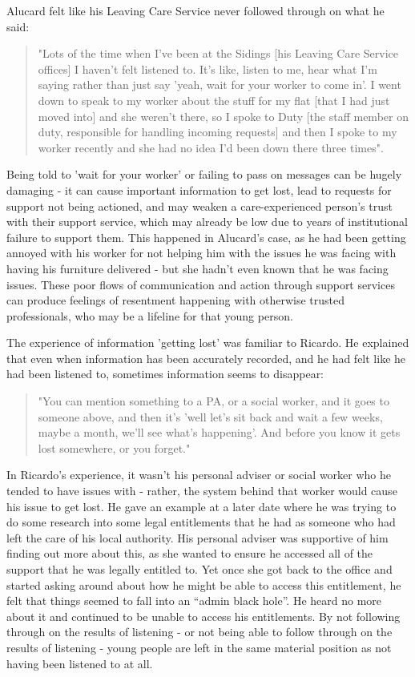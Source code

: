 Alucard felt like his Leaving Care Service never followed through on what he said:
\begin{quote}
"Lots of the time when I've been at the Sidings [his Leaving Care Service offices] I haven't felt listened to. It's like, listen to me, hear what I'm saying rather than just say 'yeah, wait for your worker to come in'. I went down to speak to my worker about the stuff for my flat [that I had just moved into] and she weren't there, so I spoke to Duty [the staff member on duty, responsible for handling incoming requests] and then I spoke to my worker recently and she had no idea I'd been down there three times".
\end{quote}
Being told to 'wait for your worker' or failing to pass on messages can be hugely damaging - it can cause important information to get lost, lead to requests for support not being actioned, and may weaken a care-experienced person’s trust with their support service, which may already be low due to years of institutional failure to support them.  This happened in Alucard’s case, as he had been getting annoyed with his worker for not helping him with the issues he was facing with having his furniture delivered - but she hadn’t even known that he was facing issues. These poor flows of communication and action through support services can produce feelings of resentment happening with otherwise trusted professionals, who may be a lifeline for that young person. 

The experience of information 'getting lost' was familiar to Ricardo. He explained that even when information has been accurately recorded, and he had felt like he had been listened to, sometimes information seems to disappear:
\begin{quote}
"You can mention something to a PA, or a social worker, and it goes to someone above, and then it's 'well let's sit back and wait a few weeks, maybe a month, we'll see what's happening'. And before you know it gets lost somewhere, or you forget."
\end{quote}
In Ricardo's experience, it wasn’t his personal adviser or social worker who he tended to have issues with - rather, the system behind that worker would cause his issue to get lost. He gave an example at a later date where he was trying to do some research into some legal entitlements that he had as someone who had left the care of his local authority. His personal adviser was supportive of him finding out more about this, as she wanted to ensure he accessed all of the support that he was legally entitled to. Yet once she got back to the office and started asking around about how he might be able to access this entitlement, he felt that things seemed to fall into an “admin black hole”. He heard no more about it and continued to be unable to access his entitlements. By not following through on the results of listening - or not being able to follow through on the results of listening - young people are left in the same material position as not having been listened to at all. 

